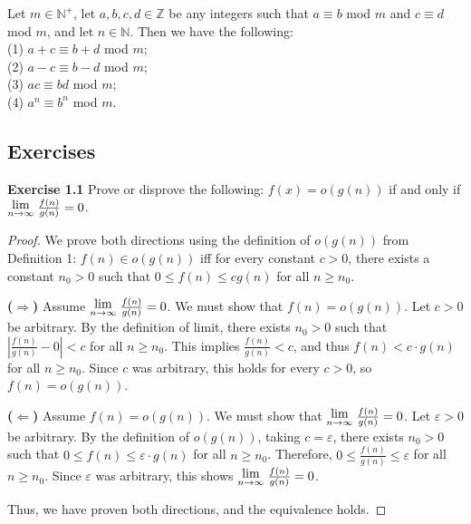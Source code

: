 \documentclass[a4paper]{article}
\newcommand{\Lim}[1]{\raisebox{0.5ex}{{$\displaystyle \lim_{#1}\;$}}}
\begin{document}
\begin{theorem}
Let $m \in \mathbb{N}^{+}$, let $a, b, c, d \in \mathbb{Z}$ be any integers such that $a \equiv b$ mod $m$ and $c \equiv d$ mod $m$, and let $n \in \mathbb{N}$. Then we have the following:\\
(1) $a + c \equiv b + d$ mod $m$;\\
(2) $a - c \equiv b - d$ mod $m$;\\
(3) $ac \equiv bd$ mod $m$;\\
(4) $a^{n} \equiv b^{n}$ mod $m$.
\end{theorem}



\begin{samepage}
\section{Exercises}
\noindent \textbf{Exercise 1.1} Prove or disprove the following: $f(x) = o(g(n))$ if and only if $\Lim{n \to \infty} \frac{f(n)}{g(n)}=0$.
\begin{proof}
We prove both directions using the definition of $o(g(n))$ from Definition 1: $f(n) \in o(g(n))$ iff for every constant $c > 0$, there exists a constant $n_{0} > 0$ such that $0 \leq f(n) \leq cg(n)$ for all $n \geq n_{0}$.

\noindent \textbf{($\Rightarrow$)} Assume $\Lim{n \to \infty} \frac{f(n)}{g(n)} = 0$. We must show that $f(n) = o(g(n))$. Let $c > 0$ be arbitrary. By the definition of limit, there exists $n_{0} > 0$ such that $\left|\frac{f(n)}{g(n)} - 0\right| < c$ for all $n \geq n_{0}$. This implies $\frac{f(n)}{g(n)} < c$, and thus $f(n) < c \cdot g(n)$ for all $n \geq n_{0}$. Since $c$ was arbitrary, this holds for every $c > 0$, so $f(n) = o(g(n))$.

\noindent \textbf{($\Leftarrow$)} Assume $f(n) = o(g(n))$. We must show that $\Lim{n \to \infty} \frac{f(n)}{g(n)} = 0$. Let $\varepsilon > 0$ be arbitrary. By the definition of $o(g(n))$, taking $c = \varepsilon$, there exists $n_{0} > 0$ such that $0 \leq f(n) \leq \varepsilon \cdot g(n)$ for all $n \geq n_{0}$. Therefore, $0 \leq \frac{f(n)}{g(n)} \leq \varepsilon$ for all $n \geq n_{0}$. Since $\varepsilon$ was arbitrary, this shows $\Lim{n \to \infty} \frac{f(n)}{g(n)} = 0$.

Thus, we have proven both directions, and the equivalence holds.
\end{proof}
\end{samepage}
\end{document}

